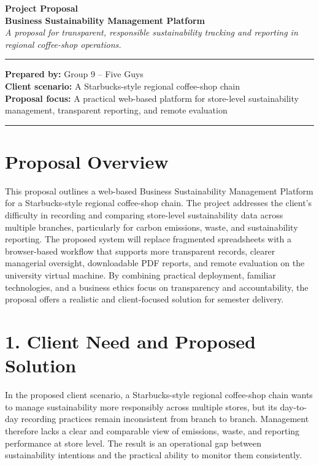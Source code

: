 \documentclass[10pt,a4paper]{article}
\begin{document}
\begin{center}
{\Large \textbf{Project Proposal}}\\
\vspace{0.25em}
{\large \textbf{Business Sustainability Management Platform}}\\
\vspace{0.35em}
{\small\itshape A proposal for transparent, responsible sustainability tracking and reporting in regional coffee-shop operations.}
\end{center}

\vspace{0.35em}
\hrule
\vspace{0.5em}
\small
\textbf{Prepared by:} Group 9 -- Five Guys\\
\textbf{Client scenario:} A Starbucks-style regional coffee-shop chain\\
\textbf{Proposal focus:} A practical web-based platform for store-level sustainability management, transparent reporting, and remote evaluation

\vspace{0.5em}
\hrule
\vspace{0.6em}

\section*{Proposal Overview}
This proposal outlines a web-based Business Sustainability Management Platform for a Starbucks-style regional coffee-shop chain. The project addresses the client's difficulty in recording and comparing store-level sustainability data across multiple branches, particularly for carbon emissions, waste, and sustainability reporting. The proposed system will replace fragmented spreadsheets with a browser-based workflow that supports more transparent records, clearer managerial oversight, downloadable PDF reports, and remote evaluation on the university virtual machine. By combining practical deployment, familiar technologies, and a business ethics focus on transparency and accountability, the proposal offers a realistic and client-focused solution for semester delivery.

\section*{1. Client Need and Proposed Solution}
In the proposed client scenario, a Starbucks-style regional coffee-shop chain wants to manage sustainability more responsibly across multiple stores, but its day-to-day recording practices remain inconsistent from branch to branch. Management therefore lacks a clear and comparable view of emissions, waste, and reporting performance at store level. The result is an operational gap between sustainability intentions and the practical ability to monitor them consistently.
\end{document}
